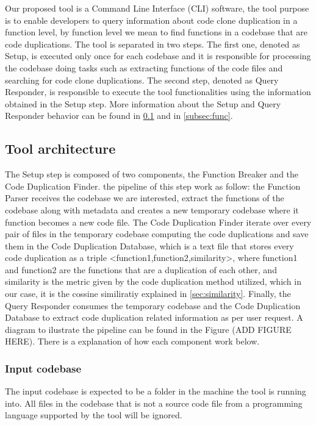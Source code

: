 \en

Our proposed tool is a Command Line Interface (CLI) software, the tool purpose is to enable developers to query 
information about code clone duplication in a function level, by function level we mean to find functions in a codebase that 
are code duplications. The tool is separated in two steps. The 
first one, denoted as Setup, is executed only once for each codebase and it is responsible for processing the
codebase doing tasks such as extracting functions of the code files 
and searching for code clone duplications. The second step, denoted as Query Responder, is
responsible to execute the tool functionalities using the information obtained in the Setup step. More information about the 
Setup and Query Responder behavior can be found in \ref{subsec:architecture} and in \ref{subsec:func}. 

\subsection{Tool architecture}
\label{subsec:architecture}

The Setup step is composed of two components, the Function Breaker and the Code Duplication Finder. the pipeline of this step work as
follow: the Function Parser receives the codebase we are interested, extract the functions of the codebase along with metadata and
creates a new temporary codebase where it function becomes a new code file. The Code Duplication Finder iterate over every pair of 
files in the temporary codebase computing the code duplications and save them in the Code Duplication Database, which is a text file
that stores every code duplication as a triple <function1,function2,similarity>, where function1 and function2 are the functions that 
are a duplication of each other, and similarity is the metric given by the code duplication method utilized, which in our case, it is
the cossine similiratiy explained in \ref{sec:similarity}. Finally, the Query Responder consumes the temporary codebase and the 
Code Duplication Database to extract code duplication related information as per user request. A diagram to ilustrate the pipeline
can be found in the Figure (ADD FIGURE HERE). There is a explanation of how each component work below.

\subsubsection{Input codebase}

The input codebase is expected to be a folder in the machine the tool is running into. All files in the codebase that is not a source
code file from a programming language supported by the tool will be ignored.


